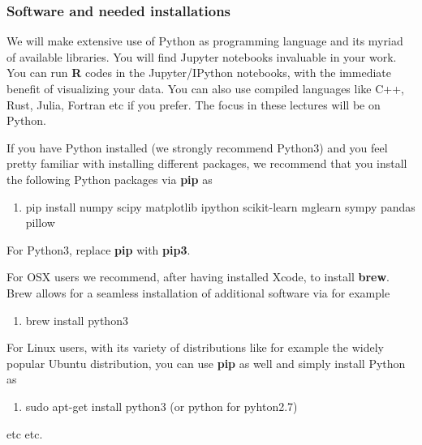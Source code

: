 \documentclass{beamer}
\begin{document}
\begin{frame}
\frametitle{Software and needed installations}

We will make extensive use of Python as programming language and its
myriad of available libraries.  You will find
Jupyter notebooks invaluable in your work.  You can run \textbf{R}
codes in the Jupyter/IPython notebooks, with the immediate benefit of
visualizing your data. You can also use compiled languages like C++,
Rust, Julia, Fortran etc if you prefer. The focus in these lectures will be
on Python.

If you have Python installed (we strongly recommend Python3) and you feel
pretty familiar with installing different packages, we recommend that
you install the following Python packages via \textbf{pip} as 

\begin{enumerate}
\item pip install numpy scipy matplotlib ipython scikit-learn mglearn sympy pandas pillow 
\end{enumerate}

\noindent
For Python3, replace \textbf{pip} with \textbf{pip3}.

For OSX users we recommend, after having installed Xcode, to
install \textbf{brew}. Brew allows for a seamless installation of additional
software via for example 

\begin{enumerate}
\item brew install python3
\end{enumerate}

\noindent
For Linux users, with its variety of distributions like for example the widely popular Ubuntu distribution,
you can use \textbf{pip} as well and simply install Python as 

\begin{enumerate}
\item sudo apt-get install python3  (or python for pyhton2.7)
\end{enumerate}

\noindent
etc etc.
\end{frame}
\end{document}
